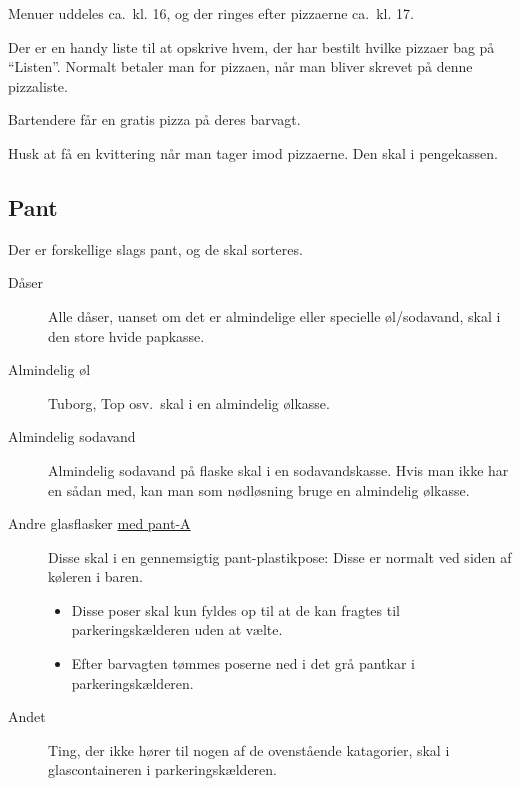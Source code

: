 Menuer uddeles ca.\ kl. 16, og der ringes efter pizzaerne ca.\ kl. 17.

Der er en handy liste til at opskrive hvem, der har bestilt hvilke
pizzaer bag på ``Listen''. Normalt betaler man for pizzaen, når man
bliver skrevet på denne pizzaliste.

Bartendere får en gratis pizza på deres barvagt.

Husk at få en kvittering når man tager imod pizzaerne. Den skal i pengekassen.

\subsection{Pant}
\label{sec:intra:pant}

Der er forskellige slags pant, og de skal sorteres.
\begin{description}
\item[Dåser] Alle dåser, uanset om det er almindelige eller specielle
  øl/sodavand, skal i den store hvide papkasse.
\item[Almindelig øl] Tuborg, Top osv.\ skal i en almindelig ølkasse.
\item[Almindelig sodavand] Almindelig sodavand på flaske skal i en
  sodavandskasse. Hvis man ikke har en sådan med, kan man som
  nødløsning bruge en almindelig ølkasse.%
\item[Andre glasflasker \underline{med pant-A}] Disse skal i en gennemsigtig
  pant-plastikpose: Disse er normalt ved siden af køleren i baren.
  \begin{itemize}
    \item Disse poser skal kun fyldes op til at de kan fragtes til parkeringskælderen uden at vælte.
    \item Efter barvagten tømmes poserne ned i det grå pantkar i parkeringskælderen.
  \end{itemize}
\item[Andet] Ting, der ikke hører til nogen af de ovenstående
  katagorier, skal i glascontaineren i parkeringskælderen.
\end{description}


